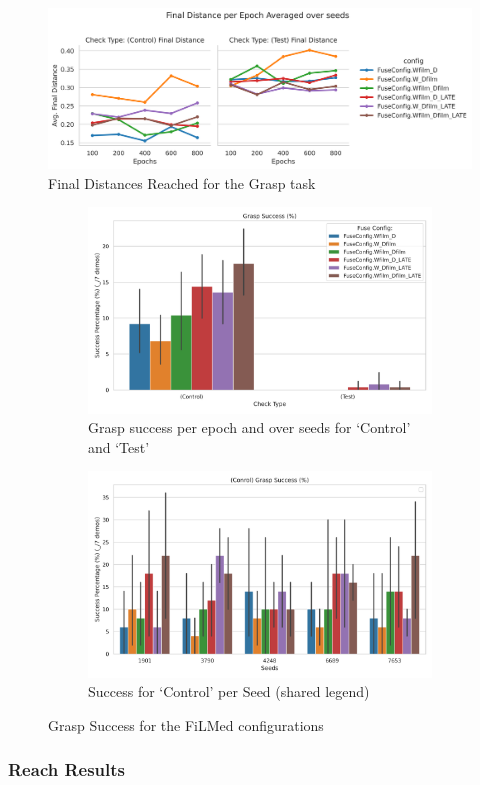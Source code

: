 \begin{figure}[htpb]
  \centering
  \includegraphics[width=\linewidth]{assets/evaluation/film/film-grasp-final.png}
  \caption{Final Distances Reached for the Grasp task}\label{fig:film-grasp-final}
\end{figure}

\begin{figure}[htpb]
  \centering
  \begin{subfigure}{0.45\linewidth}
    \centering
    \includegraphics[width=\linewidth]{assets/evaluation/film/film-grasp-success.png}
    \caption{Grasp success per epoch and over seeds for `Control' and `Test'}\label{subfig:film-grasp-success}
  \end{subfigure}
  \hfill
  \begin{subfigure}{0.45\linewidth}
    \centering
    \includegraphics[width=\linewidth]{assets/evaluation/film/film-grasp-control-success-seeds.png}
    \caption{Success for `Control' per Seed (shared legend)}\label{subfig:film-grasp-control-success-seeds}
  \end{subfigure}
  
  \caption{Grasp Success for the FiLMed configurations}\label{fig:film-grasp-success}
\end{figure}

\subsubsection{Reach Results}
